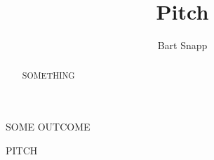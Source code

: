 \documentclass{ximera}
\title{Pitch}
\author{Bart Snapp}
\begin{document}
\begin{abstract}
  SOMETHING
\end{abstract}
\maketitle

\begin{listOutcomes}
\item{SOME OUTCOME}
\end{listOutcomes}


\begin{question}
PITCH
\end{question}
\mynewpage
\end{document}
